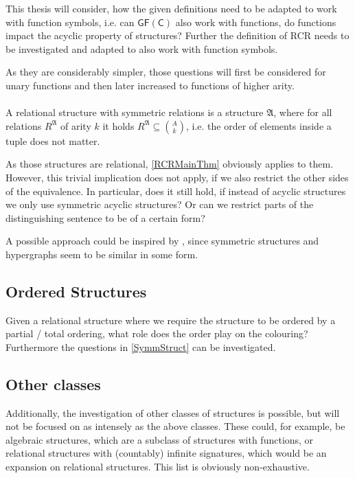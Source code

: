 \documentclass[a4paper,11pt,DIV=15]{scrartcl} %
\theoremstyle{plain}
\theoremstyle{definition}
\begin{document}
This thesis will consider, how the given definitions need to be adapted to work with function symbols, i.e. can $\mathsf{GF(C)}$ also work with functions, do functions impact the acyclic property of structures?
Further the definition of RCR needs to be investigated and adapted to also work with function symbols.

As they are considerably simpler, those questions will first be considered for unary functions and then later increased to functions of higher arity.
\label{StructWFunc}
\\ \\
A relational structure with symmetric relations is a structure $\mathfrak A$, where for all relations $R^\mathfrak A$ of arity $k$ it holds $R^\mathfrak A \subseteq \binom{A}{k}$, i.e. the order of elements inside a tuple does not matter.

As those structures are relational, \cref{RCRMainThm} obviously applies to them.
However, this trivial implication does not apply, if we also restrict the other sides of the equivalence.
In particular, does it still hold, if instead of acyclic structures we only use symmetric acyclic structures?
Or can we restrict parts of the distinguishing sentence to be of a certain form?

A possible approach could be inspired by \cite{scheidt2023counting}, since symmetric structures and hypergraphs seem to be similar in some form.
\label{SymmStruct}

\iffalse
\subsection{Ordered Structures}

Given a relational structure where we require the structure to be ordered by a partial / total ordering, what role does the order play on the colouring?
Furthermore the questions in \cref{SymmStruct} can be investigated.

\subsection{Other classes}

Additionally, the investigation of other classes of structures is possible, but will not be focused on as intensely as the above classes.
These could, for example, be algebraic structures, which are a subclass of structures with functions, or relational structures with (countably) infinite signatures, which would be an expansion on relational structures.
This list is obviously non-exhaustive.
\end{document}
